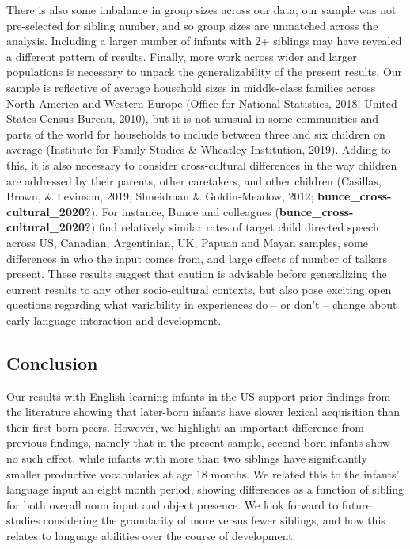 \documentclass[
  man,mask,floatsintext]{apa6}
\begin{document}
There is also some imbalance in group sizes across our data; our sample was not pre-selected for sibling number, and so group sizes are unmatched across the analysis. Including a larger number of infants with 2+ siblings may have revealed a different pattern of results. Finally, more work across wider and larger populations is necessary to unpack the generalizability of the present results. Our sample is reflective of average household sizes in middle-class families across North America and Western Europe (Office for National Statistics, 2018; United States Census Bureau, 2010), but it is not unusual in some communities and parts of the world for households to include between three and six children on average (Institute for Family Studies \& Wheatley Institution, 2019). Adding to this, it is also necessary to consider cross-cultural differences in the way children are addressed by their parents, other caretakers, and other children (Casillas, Brown, \& Levinson, 2019; Shneidman \& Goldin‐Meadow, 2012; \textbf{bunce\_cross-cultural\_2020?}). For instance, Bunce and colleagues (\textbf{bunce\_cross-cultural\_2020?}) find relatively similar rates of target child directed speech across US, Canadian, Argentinian, UK, Papuan and Mayan samples, some differences in who the input comes from, and large effects of number of talkers present. These results suggest that caution is advisable before generalizing the current results to any other socio-cultural contexts, but also pose exciting open questions regarding what variability in experiences do -- or don't -- change about early language interaction and development.

\hypertarget{conclusion}{%
\subsection{Conclusion}\label{conclusion}}

Our results with English-learning infants in the US support prior findings from the literature showing that later-born infants have slower lexical acquisition than their first-born peers. However, we highlight an important difference from previous findings, namely that in the present sample, second-born infants show no such effect, while infants with more than two siblings have significantly smaller productive vocabularies at age 18 months. We related this to the infants' language input an eight month period, showing differences as a function of sibling for both overall noun input and object presence. We look forward to future studies considering the granularity of more versus fewer siblings, and how this relates to language abilities over the course of development.
\end{document}
